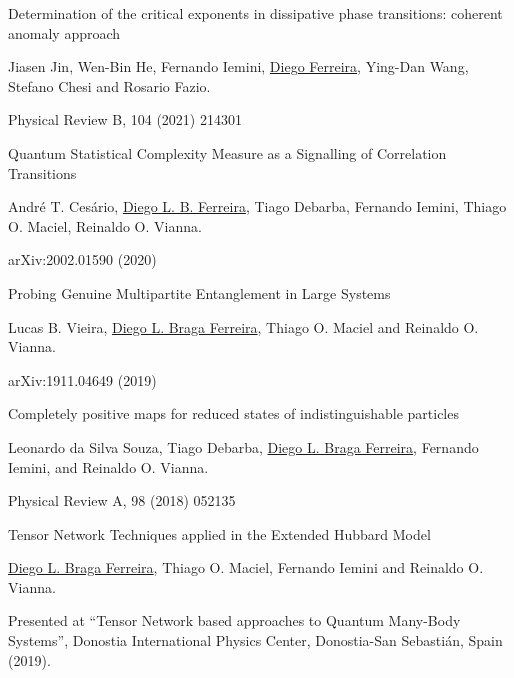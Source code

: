 \documentclass[a4paper,10pt]{article}
\newlength{\cvcolumngapwidth}
\newlength{\cvleftcolumnwidth}
\newlength{\cvrightcolumnwidth}
\newcommand{\cvtitlestyle}[1]{{\normalsize\cvtitlefont\textcolor{cvtitlecolor}{#1}}}
\newcommand{\cvdurationstyle}[1]{{\normalsize\cvdurationfont\textcolor{cvdurationcolor}{#1}}}
\newlength{\cvafteritemskipamount}
\newlength{\cvaftertitleskipamount}
\newlength{\cvparskip}
\newcommand{\cvitem}[2]{
    \begin{minipage}[t]{\cvleftcolumnwidth}
        \raggedleft #1
    \end{minipage}%
    \hspace{\cvcolumngapwidth}%
    \begin{minipage}[t]{\cvrightcolumnwidth}
        \setlength{\parskip}{\cvparskip} #2
    \end{minipage}
    \vspace{\cvafteritemskipamount}}
\newcommand{\cvtitle}[1]{
    \cvtitlestyle{#1}
    \vspace{\cvaftertitleskipamount}
    \vspace{-\cvparskip}}
\begin{document}
\cvitem{\cvdurationstyle{Journal}}
    {\cvtitle{Determination of the critical exponents in dissipative phase transitions: coherent anomaly approach}
    
    \vspace{0.2cm}
    Jiasen Jin, Wen-Bin He, Fernando Iemini, \underline{Diego Ferreira}, Ying-Dan Wang, Stefano Chesi and Rosario Fazio.
    
    \vspace{0.2cm}
    Physical Review B, 104 (2021) 214301}
    
\cvitem{\cvdurationstyle{Preprint}}
    {\cvtitle{Quantum Statistical Complexity Measure as a Signalling of Correlation Transitions}
    
    \vspace{0.2cm}
    Andr\'e T. Ces\'ario, \underline{Diego L. B. Ferreira}, Tiago Debarba, Fernando Iemini, Thiago O. Maciel, Reinaldo O. Vianna.
    
    \vspace{0.2cm}
    arXiv:2002.01590 (2020)}
        
\cvitem{\cvdurationstyle{Preprint}}
    {\cvtitle{Probing Genuine Multipartite Entanglement in Large Systems}
    
    \vspace{0.2cm}
    Lucas B. Vieira, \underline{Diego L. Braga Ferreira}, Thiago O. Maciel and Reinaldo O. Vianna.
    
    \vspace{0.2cm}
    arXiv:1911.04649 (2019)}
        
\cvitem{\cvdurationstyle{Journal}}
    {\cvtitle{Completely positive maps for reduced states of indistinguishable particles}
    
    \vspace{0.2cm}
    Leonardo da Silva Souza, Tiago Debarba, \underline{Diego L. Braga Ferreira}, Fernando Iemini, and Reinaldo O. Vianna.
    
    \vspace{0.2cm}
    Physical Review A, 98 (2018) 052135}
    
\cvitem{\cvdurationstyle{Poster}}
    {\cvtitle{Tensor Network Techniques applied in the Extended
    Hubbard Model}
    
    \vspace{0.2cm}
    \underline{Diego L. Braga Ferreira}, Thiago O. Maciel, Fernando Iemini and Reinaldo O. Vianna.
    
    \vspace{0.2cm}
    Presented at ``Tensor Network based approaches to Quantum Many-Body Systems'', Donostia International Physics Center, Donostia-San Sebasti\'an, Spain (2019).}
    
\end{document}
